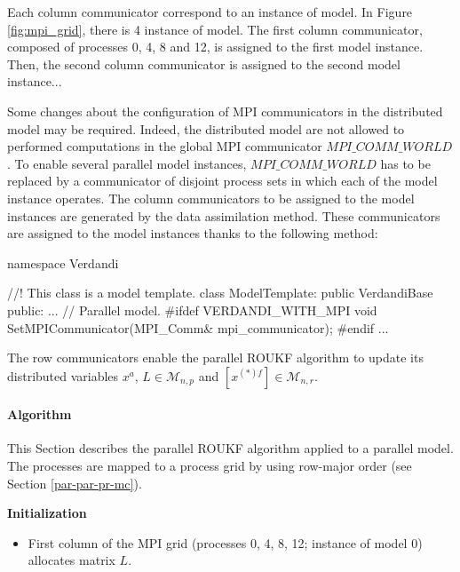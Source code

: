\documentclass{tufte-book}
\begin{document}
Each column communicator correspond to an instance of model. In Figure \ref{fig:mpi_grid}, there is 4 instance of model. The first column communicator, composed of processes 0, 4, 8 and 12, is assigned to the first model instance. Then, the second column communicator is assigned to the second model instance...

Some changes  about the configuration of MPI communicators in the distributed model may be required. Indeed, the distributed model are not allowed to performed computations in the global MPI communicator $MPI\_COMM\_WORLD$. To enable several parallel model instances, $MPI\_COMM\_WORLD$ has to be replaced by a communicator of disjoint process sets in which each of the model instance operates. The column communicators to be assigned to the model instances are generated by the data assimilation method. These communicators are assigned to the model instances thanks to the following method:

\begin{frame_cpp}
namespace Verdandi
{


    //! This class is a model template.
    class ModelTemplate: public VerdandiBase
    {
        public:
            ...
            // Parallel model.
#ifdef VERDANDI_WITH_MPI
            void SetMPICommunicator(MPI_Comm& mpi_communicator);
#endif
            ...
    }

}
\end{frame_cpp}

The row communicators enable the parallel ROUKF algorithm to update its distributed variables $x^a$, $L \in \mathcal{M}_{n,p}$ and $ [x^{(*)f}] \in \mathcal{M}_{n,r}$.


\hypertarget{par-par-pr-a}{}\paragraph{Algorithm}\label{par-par-pr-a}

This Section describes the parallel ROUKF algorithm applied to a parallel model. The processes are mapped to a process grid by using row-major order (see Section \ref{par-par-pr-mc}).


\par \textbf{Initialization}

  \begin{itemize}

 \item First column  of the MPI grid (processes 0, 4, 8, 12; instance of model 0) allocates matrix $L$.\\

 \end{itemize}
\end{document}
